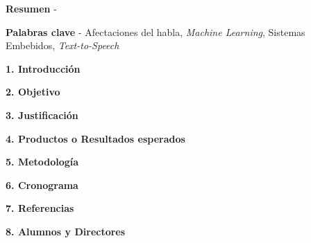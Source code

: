 \documentclass[10pt]{report}
\begin{document}


\hfill\break
\justifying
\textbf{Resumen} - 

\hfill \break
\textbf{Palabras clave} - Afectaciones del habla, \textit{Machine Learning}, Sistemas Embebidos, \textit{Text-to-Speech}

\hfill \break
{\fontsize{12}{14}\textbf{1. Introducción}}
\hfill \break


\hfill \break
{\fontsize{12}{14}\textbf{2. Objetivo}}
\hfill \break
\justifying


\hfill \break
{\fontsize{12}{14}\textbf{3. Justificación}}
\hfill \break
\justifying


\hfill \break
{\fontsize{12}{14}\textbf{4. Productos o Resultados esperados}}
\hfill \break
\justifying


\hfill \break
{\fontsize{12}{14}\textbf{5. Metodología}}
\hfill \break
\justifying


\hfill \break
\hfill \break
\hfill \break
\hfill \break
{\fontsize{12}{14}\textbf{6. Cronograma}}


\newpage
\hfill \break
{\fontsize{12}{14}\textbf{7. Referencias}}

\hfill \break


\newpage

{\fontsize{12}{14}\textbf{8. Alumnos y Directores}}


\end{document}
